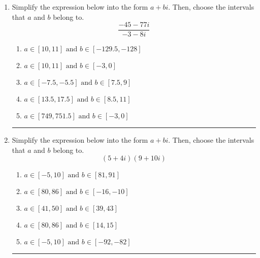 \documentclass[14pt]{extbook}
\newcommand{\litem}[1]{\item#1\hspace*{-1cm}\rule{\textwidth}{0.4pt}}
\begin{document}
\begin{enumerate}
{\begin{enumerate}[label=\Alph*.]
\end{enumerate} }
\litem{
Simplify the expression below into the form $a+bi$. Then, choose the intervals that $a$ and $b$ belong to.\[ \frac{-45 - 77 i}{-3 - 8 i} \]\begin{enumerate}[label=\Alph*.]
\item \( a \in [10, 11] \text{ and } b \in [-129.5, -128] \)
\item \( a \in [10, 11] \text{ and } b \in [-3, 0] \)
\item \( a \in [-7.5, -5.5] \text{ and } b \in [7.5, 9] \)
\item \( a \in [13.5, 17.5] \text{ and } b \in [8.5, 11] \)
\item \( a \in [749, 751.5] \text{ and } b \in [-3, 0] \)

\end{enumerate} }
\litem{
Simplify the expression below into the form $a+bi$. Then, choose the intervals that $a$ and $b$ belong to.\[ (5 + 4 i)(9 + 10 i) \]\begin{enumerate}[label=\Alph*.]
\item \( a \in [-5, 10] \text{ and } b \in [81, 91] \)
\item \( a \in [80, 86] \text{ and } b \in [-16, -10] \)
\item \( a \in [41, 50] \text{ and } b \in [39, 43] \)
\item \( a \in [80, 86] \text{ and } b \in [14, 15] \)
\item \( a \in [-5, 10] \text{ and } b \in [-92, -82] \)

\end{enumerate} }
\end{enumerate}
\end{document}
